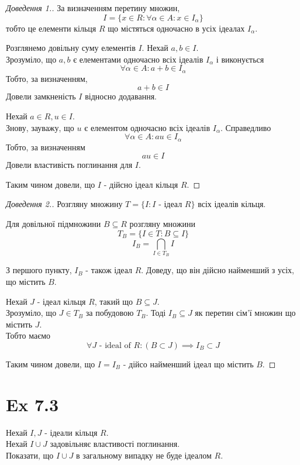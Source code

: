\documentclass[11pt, a4paper]{article} %
\begin{document}
\begin{proof}[Доведення 1.]
    За визначенням перетину множин,
    \[I = \{x \in R: \forall \alpha \in A: x \in I_\alpha\}\]
    тобто це елементи кільця $R$ що містяться одночасно в усіх ідеалах $I_\alpha$. 

    Розглянемо довільну суму елементів $I$. Нехай $a,b \in I$.\\
    Зрозуміло, що $a,b$ є елементами одночасно всіх ідеалів $I_\alpha$ і виконується
    \[\forall \alpha\in A: a+b \in I_\alpha\]
    Тобто, за визначенням,
    \[a+b \in I\]
    Довели замкненість $I$ відносно додавання.

    Нехай $a \in R, u \in I$.\\
    Знову, зауважу, що $u$ є елементом одночасно всіх ідеалів $I_\alpha$.
    Справедливо
    \[\forall \alpha\in A: au \in I_\alpha\]
    Тобто, за визначенням
    \[au \in I\]
    Довели властивість поглинання для $I$.

    Таким чином довели, що $I$ - дійсно ідеал кільця $R$.
\end{proof}

\begin{proof}[Доведення 2.]
    Розгляну множину $T = \{I: I$ - ідеал $R\}$ всіх ідеалів кільця.

    Для довільної підмножини $B \subseteq R$ розгляну множини
    \[T_B = \{I \in T: B \subseteq I\}\]
    \[I_B = \bigcap_{I \in T_B}I\]

    З першого пункту, $I_B$ - також ідеал $R$. Доведу, що він дійсно найменший з усіх, що містить $B$.

    Нехай $J$ - ідеал кільця $R$, такий що $B \subseteq J$.\\
    Зрозуміло, що $J \in T_B$ за побудовою $T_B$. Тоді $I_B \subseteq J$ як перетин сім'ї множин що містить $J$.\\
    Тобто маємо
    \[\forall J \text{ - ideal of } R : (B \subset J) \implies I_B \subset J\]
    
    Таким чином довели, що $I=I_B$ - дійсо найменший ідеал що містить $B$.
\end{proof}


\section*{Ex 7.3}
\begin{mdframed}
    Нехай $I,J$ - ідеали кільця $R$.\\
    Нехай $I \cup J$ задовільняє властивості поглинання.\\
    Показати, що $I\cup J$ в загальному випадку не буде ідеалом $R$.
\end{mdframed}
\end{document}
